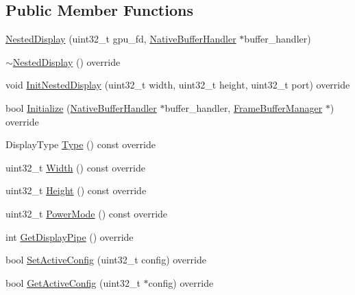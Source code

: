 \subsection*{Public Member Functions}
\begin{DoxyCompactItemize}
\item 
\mbox{\hyperlink{classhwcomposer_1_1NestedDisplay_af672e7013e7a0c609a434ff995e41ead}{Nested\+Display}} (uint32\+\_\+t gpu\+\_\+fd, \mbox{\hyperlink{classhwcomposer_1_1NativeBufferHandler}{Native\+Buffer\+Handler}} $\ast$buffer\+\_\+handler)
\item 
\mbox{\hyperlink{classhwcomposer_1_1NestedDisplay_a87f5d333cf763aeeffcff35531c34428}{$\sim$\+Nested\+Display}} () override
\item 
void \mbox{\hyperlink{classhwcomposer_1_1NestedDisplay_a39b326bbbe10454953815bb3e339c821}{Init\+Nested\+Display}} (uint32\+\_\+t width, uint32\+\_\+t height, uint32\+\_\+t port) override
\item 
bool \mbox{\hyperlink{classhwcomposer_1_1NestedDisplay_a40b99528a66752bbdf03f253476e5255}{Initialize}} (\mbox{\hyperlink{classhwcomposer_1_1NativeBufferHandler}{Native\+Buffer\+Handler}} $\ast$buffer\+\_\+handler, \mbox{\hyperlink{classhwcomposer_1_1FrameBufferManager}{Frame\+Buffer\+Manager}} $\ast$) override
\item 
Display\+Type \mbox{\hyperlink{classhwcomposer_1_1NestedDisplay_a5e0cd87bc15e94b2997fcfbb37060602}{Type}} () const override
\item 
uint32\+\_\+t \mbox{\hyperlink{classhwcomposer_1_1NestedDisplay_ab3c886e199ed0eb383496eb3c3b9da9c}{Width}} () const override
\item 
uint32\+\_\+t \mbox{\hyperlink{classhwcomposer_1_1NestedDisplay_ad83400a54d34d803fd427d9dc17ca95f}{Height}} () const override
\item 
uint32\+\_\+t \mbox{\hyperlink{classhwcomposer_1_1NestedDisplay_a7f08b439ab7e67ba6344471b9efe7d62}{Power\+Mode}} () const override
\item 
int \mbox{\hyperlink{classhwcomposer_1_1NestedDisplay_a71d26edcadd23a93362ca5643dc1f6cf}{Get\+Display\+Pipe}} () override
\item 
bool \mbox{\hyperlink{classhwcomposer_1_1NestedDisplay_abfb4cca89f1ae116a487f92a6d1143a8}{Set\+Active\+Config}} (uint32\+\_\+t config) override
\item 
bool \mbox{\hyperlink{classhwcomposer_1_1NestedDisplay_ac29629de6ce1e74a1086e8de7239b45a}{Get\+Active\+Config}} (uint32\+\_\+t $\ast$config) override
\item 

\end{DoxyCompactItemize}
